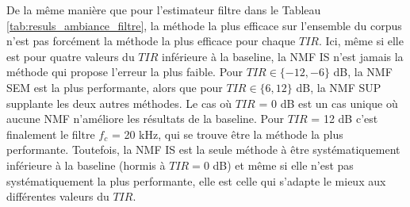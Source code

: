 \begin{table}[h]
\centering
\caption{Erreurs $MAE_{TIR}$ selon les combinaisons optimales de la NMF SUP, SEM et IS.}
\label{tab:mae_tir_ambiance}
\end{table}

De la même manière que pour l'estimateur filtre dans le Tableau \ref{tab:resuls_ambiance_filtre}, la méthode la plus efficace sur l'ensemble du corpus n'est pas forcément la méthode la plus efficace pour chaque $TIR$. Ici, même si elle est pour quatre valeurs du $TIR$ inférieure à la baseline, la NMF IS n'est jamais la méthode qui propose l'erreur la plus faible. Pour $TIR \in \lbrace -12, -6 \rbrace$ dB, la NMF SEM est la plus performante, alors que pour $TIR\in \lbrace 6, 12 \rbrace$ dB, la NMF SUP supplante les deux autres méthodes. 
Le cas où $TIR$ = 0 dB est un cas unique où aucune NMF n'améliore les résultats de la baseline. Pour $TIR$ = 12 dB c'est finalement le filtre $f_c$ = 20 kHz, qui se trouve être la méthode la plus performante. Toutefois, la NMF IS est la seule méthode à être systématiquement inférieure à la baseline (hormis à $TIR = 0$ dB) et même si elle n'est pas systématiquement la plus performante, elle est celle qui s'adapte le mieux aux différentes valeurs du $TIR$.\\

